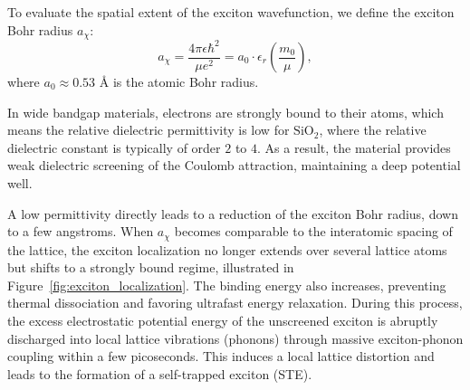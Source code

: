 To evaluate the spatial extent of the exciton wavefunction, we define the exciton Bohr radius $a_\chi$:
\begin{equation}
    a_\chi = \frac{4\pi \epsilon \hbar^2}{\mu e^2} = a_0 \cdot \epsilon_r \left(\frac{m_0}{\mu}\right),
    \label{eq:exciton_bohr_radius}
\end{equation}
where $a_0 \approx 0.53\text{ \AA}$ is the atomic Bohr radius.

In wide bandgap materials, electrons are strongly bound to their atoms, which means the relative dielectric permittivity is low for $\mathrm{SiO}_2$, where the relative dielectric constant is typically of order $2$ to $4$. As a result, the material provides weak dielectric screening of the Coulomb attraction, maintaining a deep potential well.

A low permittivity directly leads to a reduction of the exciton Bohr radius, down to a few angstroms. When $a_\chi$ becomes comparable to the interatomic spacing of the lattice, the exciton localization no longer extends over several lattice atoms but shifts to a strongly bound regime, illustrated in Figure~\ref{fig:exciton_localization}. The binding energy also increases, preventing thermal dissociation and favoring ultrafast energy relaxation. During this process, the excess electrostatic potential energy of the unscreened exciton is abruptly discharged into local lattice vibrations (phonons) through massive exciton-phonon coupling within a few picoseconds. This induces a local lattice distortion and leads to the formation of a self-trapped exciton (STE).

